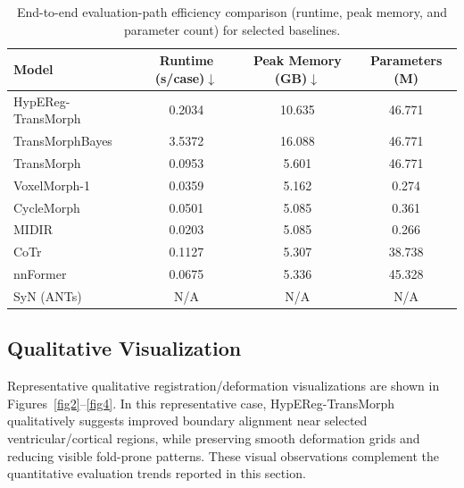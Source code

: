 \documentclass[11pt,a4paper]{article}
\begin{document}
\begin{table}[t]
\caption{End-to-end evaluation-path efficiency comparison (runtime, peak memory, and parameter count) for selected baselines.\label{tab3}}
\begin{tabularx}{\textwidth}{lccc}
\toprule
\textbf{Model} & \textbf{Runtime (s/case)\(\downarrow\)} & \textbf{Peak Memory (GB)\(\downarrow\)} & \textbf{Parameters (M)}\\
\midrule
HypEReg-TransMorph & 0.2034 & 10.635 & 46.771 \\
TransMorphBayes & 3.5372 & 16.088 & 46.771 \\
TransMorph & 0.0953 & 5.601 & 46.771 \\
VoxelMorph-1 & 0.0359 & 5.162 & 0.274 \\
CycleMorph & 0.0501 & 5.085 & 0.361 \\
MIDIR & 0.0203 & 5.085 & 0.266 \\
CoTr & 0.1127 & 5.307 & 38.738 \\
nnFormer & 0.0675 & 5.336 & 45.328 \\
SyN (ANTs) & N/A & N/A & N/A \\
\bottomrule
\end{tabularx}
\end{table}

\subsection{Qualitative Visualization}
Representative qualitative registration/deformation visualizations are shown in Figures~\ref{fig2}--\ref{fig4}. In this representative case, HypEReg-TransMorph qualitatively suggests improved boundary alignment near selected ventricular/cortical regions, while preserving smooth deformation grids and reducing visible fold-prone patterns. These visual observations complement the quantitative evaluation trends reported in this section.
\end{document}
